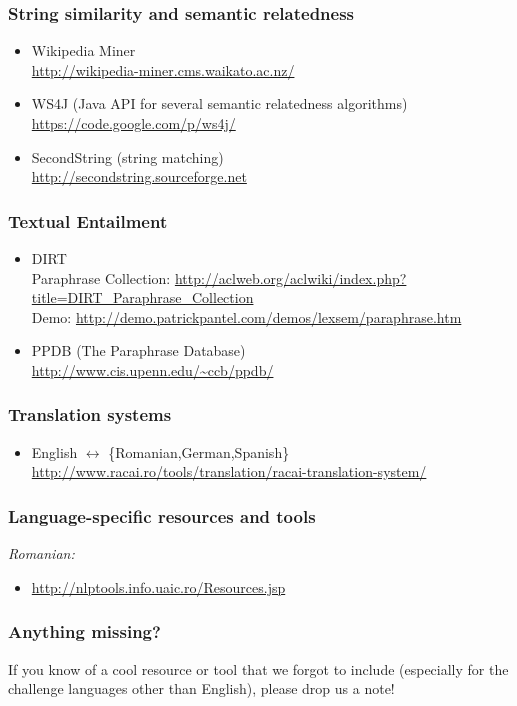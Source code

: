 \subsubsection*{String similarity and semantic relatedness}

\begin{itemize}
\item Wikipedia Miner \\
      \url{http://wikipedia-miner.cms.waikato.ac.nz/}
\item WS4J (Java API for several semantic relatedness algorithms) \\
      \url{https://code.google.com/p/ws4j/}
\item SecondString (string matching) \\ 
      \url{http://secondstring.sourceforge.net}
\end{itemize}

\subsubsection*{Textual Entailment}

\begin{itemize}
\item DIRT \\
      Paraphrase Collection: \url{http://aclweb.org/aclwiki/index.php?title=DIRT_Paraphrase_Collection} \\
      Demo: \url{http://demo.patrickpantel.com/demos/lexsem/paraphrase.htm}
\item PPDB (The Paraphrase Database) \\
      \url{http://www.cis.upenn.edu/~ccb/ppdb/}      
\end{itemize}

\subsubsection*{Translation systems}

\begin{itemize}
\item English $\leftrightarrow$ \{Romanian,German,Spanish\} \\
\url{http://www.racai.ro/tools/translation/racai-translation-system/}
\end{itemize}

\subsubsection*{Language-specific resources and tools}

\emph{Romanian:}
\begin{itemize} 
\item \url{http://nlptools.info.uaic.ro/Resources.jsp}
\end{itemize}


\subsubsection*{Anything missing?} 

If you know of a cool resource or tool that we forgot to include (especially for the challenge languages other than English), 
please drop us a note! 

